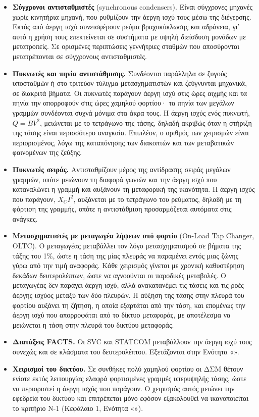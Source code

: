 \begin{itemize}
\item \textbf{Σύγχρονοι αντισταθμιστές} (synchronous condensers). Είναι σύγχρονες μηχανές χωρίς
      κινητήρια μηχανή, που ρυθμίζουν την άεργη ισχύ τους μέσω της διέγερσης. Εκτός από άεργη
      ισχύ συνεισφέρουν ρεύμα βραχυκύκλωσης και αδράνεια, γι' αυτό η χρήση τους επεκτείνεται σε
      συστήματα με υψηλή διείσδυση μονάδων με μετατροπείς. Σε ορισμένες περιπτώσεις γεννήτριες
      σταθμών που αποσύρονται μετατρέπονται σε σύγχρονους αντισταθμιστές.
\item \textbf{Πυκνωτές και πηνία αντιστάθμισης.} Συνδέονται παράλληλα σε ζυγούς υποσταθμών ή
      στο τριτεύον τύλιγμα μετασχηματιστών και ζεύγνυνται μηχανικά, σε διακριτά βήματα. Οι
      πυκνωτές παράγουν άεργη ισχύ στις ώρες αιχμής και τα πηνία την απορροφούν στις ώρες
      χαμηλού φορτίου· τα πηνία των μεγάλων γραμμών συνδέονται συχνά μόνιμα στα άκρα τους. Η
      άεργη ισχύς ενός πυκνωτή, $Q = BV^2$, μειώνεται με το τετράγωνο της τάσης, δηλαδή ακριβώς
      όταν η στήριξη της τάσης είναι περισσότερο αναγκαία. Επιπλέον, ο αριθμός των χειρισμών
      είναι περιορισμένος, λόγω της καταπόνησης των διακοπτών και των μεταβατικών φαινομένων
      της ζεύξης.
\item \textbf{Πυκνωτές σειράς.} Αντισταθμίζουν μέρος της αντίδρασης σειράς μεγάλων γραμμών,
      οπότε μειώνουν τη διαφορά γωνιών και την άεργη ισχύ που καταναλώνει η γραμμή και
      αυξάνουν τη μεταφορική της ικανότητα. Η άεργη ισχύς που παράγουν, $X_C I^2$, αυξάνεται
      με το τετράγωνο του ρεύματος, δηλαδή με τη φόρτιση της γραμμής, οπότε η αντιστάθμιση
      προσαρμόζεται αυτόματα στις ανάγκες.
\item \textbf{Μετασχηματιστές με μεταγωγέα λήψεων υπό φορτίο} (On-Load Tap Changer, OLTC). Ο
      μεταγωγέας μεταβάλλει τον λόγο μετασχηματισμού σε βήματα της τάξης του 1\%, ώστε η τάση
      της μίας πλευράς να παραμένει εντός μιας ζώνης γύρω από την τιμή αναφοράς. Κάθε
      χειρισμός γίνεται με χρονική καθυστέρηση δεκάδων δευτερολέπτων, ώστε να αγνοούνται οι
      παροδικές μεταβολές. Ο μεταγωγέας δεν παράγει άεργη ισχύ, αλλά ανακατανέμει τις τάσεις
      και τις ροές άεργης ισχύος μεταξύ των δύο πλευρών. Η αύξηση της τάσης στην πλευρά του
      φορτίου αυξάνει τη ζήτηση, η οποία εξαρτάται από την τάση, και επομένως την άεργη ισχύ
      που απορροφάται από το δίκτυο μεταφοράς, με αποτέλεσμα να μειώνεται η τάση στην πλευρά
      του δικτύου μεταφοράς.
\item \textbf{Διατάξεις FACTS.} Οι SVC και STATCOM μεταβάλλουν την άεργη ισχύ τους συνεχώς και
      σε κλάσματα του δευτερολέπτου. Εξετάζονται στην Ενότητα «».
\item \textbf{Χειρισμοί του δικτύου.} Σε συνθήκες πολύ χαμηλού φορτίου οι ΔΣΜ θέτουν ενίοτε
      εκτός λειτουργίας ελαφρά φορτισμένες γραμμές υπερυψηλής τάσης, ώστε να περιοριστεί η
      άεργη ισχύς που παράγουν. Ο χειρισμός αυτός μειώνει την εφεδρεία του δικτύου και
      επιτρέπεται μόνο εφόσον εξακολουθεί να ικανοποιείται το κριτήριο N-1 (Κεφάλαιο 1,
      Ενότητα «»).
\end{itemize}

